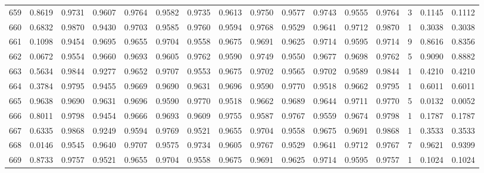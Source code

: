 \begin{tabular}{lrrrrrrrrrrrrrrr}
659 &      0.8619 &  0.9731 &  0.9607 &  0.9764 &  0.9582 &  0.9735 &  0.9613 &  0.9750 &  0.9577 &  0.9743 &   0.9555 &     0.9764 &      3 &                    0.1145 &                     0.1112 \\
660 &      0.6832 &  0.9870 &  0.9430 &  0.9703 &  0.9585 &  0.9760 &  0.9594 &  0.9768 &  0.9529 &  0.9641 &   0.9712 &     0.9870 &      1 &                    0.3038 &                     0.3038 \\
661 &      0.1098 &  0.9454 &  0.9695 &  0.9655 &  0.9704 &  0.9558 &  0.9675 &  0.9691 &  0.9625 &  0.9714 &   0.9595 &     0.9714 &      9 &                    0.8616 &                     0.8356 \\
662 &      0.0672 &  0.9554 &  0.9660 &  0.9693 &  0.9605 &  0.9762 &  0.9590 &  0.9749 &  0.9550 &  0.9677 &   0.9698 &     0.9762 &      5 &                    0.9090 &                     0.8882 \\
663 &      0.5634 &  0.9844 &  0.9277 &  0.9652 &  0.9707 &  0.9553 &  0.9675 &  0.9702 &  0.9565 &  0.9702 &   0.9589 &     0.9844 &      1 &                    0.4210 &                     0.4210 \\
664 &      0.3784 &  0.9795 &  0.9455 &  0.9669 &  0.9690 &  0.9631 &  0.9696 &  0.9590 &  0.9770 &  0.9518 &   0.9662 &     0.9795 &      1 &                    0.6011 &                     0.6011 \\
665 &      0.9638 &  0.9690 &  0.9631 &  0.9696 &  0.9590 &  0.9770 &  0.9518 &  0.9662 &  0.9689 &  0.9644 &   0.9711 &     0.9770 &      5 &                    0.0132 &                     0.0052 \\
666 &      0.8011 &  0.9798 &  0.9454 &  0.9666 &  0.9693 &  0.9609 &  0.9755 &  0.9587 &  0.9767 &  0.9559 &   0.9674 &     0.9798 &      1 &                    0.1787 &                     0.1787 \\
667 &      0.6335 &  0.9868 &  0.9249 &  0.9594 &  0.9769 &  0.9521 &  0.9655 &  0.9704 &  0.9558 &  0.9675 &   0.9691 &     0.9868 &      1 &                    0.3533 &                     0.3533 \\
668 &      0.0146 &  0.9545 &  0.9640 &  0.9707 &  0.9575 &  0.9734 &  0.9605 &  0.9767 &  0.9529 &  0.9641 &   0.9712 &     0.9767 &      7 &                    0.9621 &                     0.9399 \\
669 &      0.8733 &  0.9757 &  0.9521 &  0.9655 &  0.9704 &  0.9558 &  0.9675 &  0.9691 &  0.9625 &  0.9714 &   0.9595 &     0.9757 &      1 &                    0.1024 &                     0.1024 \\

\end{tabular}
